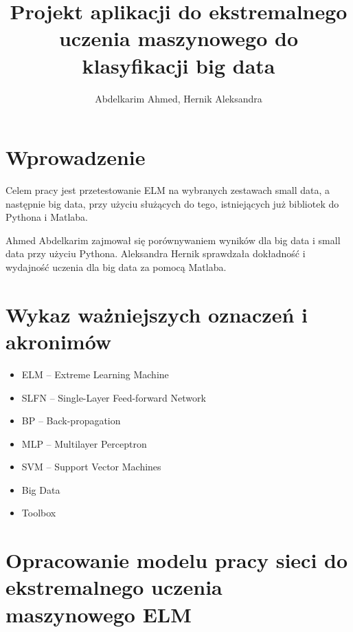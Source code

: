 \documentclass{article}
\title{Projekt aplikacji do ekstremalnego uczenia maszynowego do klasyfikacji big data}
\author{Abdelkarim Ahmed, Hernik Aleksandra}
\date{}
\begin{document}
\clearpage
\vspace*{\fill}
\begin{center}
\begin{minipage}{.9\textwidth}
\maketitle
\end{minipage}
\end{center}
\vfill %
\clearpage

\tableofcontents
\clearpage

\section*{Wprowadzenie}
Celem pracy jest przetestowanie ELM na wybranych zestawach small data, a następnie big data, przy użyciu służących do tego, istniejących już bibliotek do Pythona i Matlaba.

Ahmed Abdelkarim zajmował się porównywaniem wyników dla big data i small data przy użyciu Pythona.
Aleksandra Hernik sprawdzała dokładność i wydajność uczenia dla big data za pomocą Matlaba.
\clearpage
\section*{Wykaz ważniejszych oznaczeń i akronimów}
\begin{itemize}[label={},leftmargin=*]
\item ELM -- Extreme Learning Machine
\item SLFN -- Single-Layer Feed-forward Network 
\item BP -- Back-propagation
\item MLP -- Multilayer Perceptron
\item SVM -- Support Vector Machines
\item Big Data
\item Toolbox
\end{itemize}
\clearpage
\section{Opracowanie modelu pracy sieci do ekstremalnego uczenia maszynowego ELM}
\end{document}
